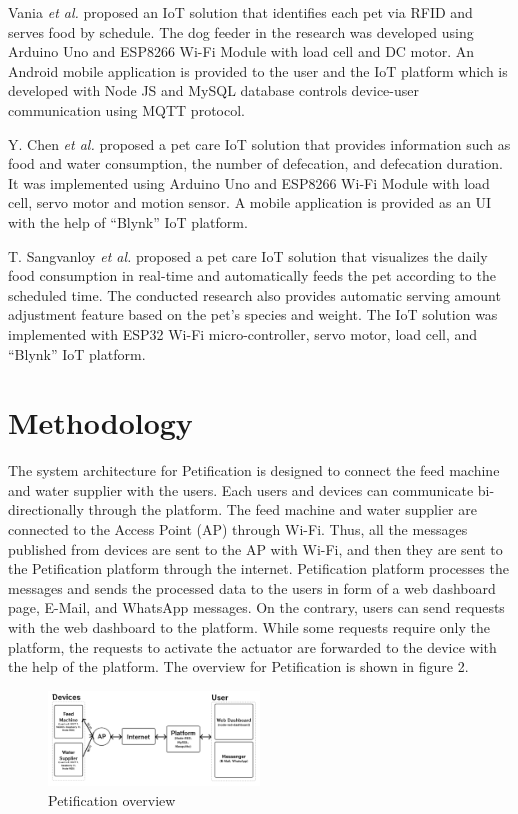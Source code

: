 \documentclass[conference]{IEEEtran}
\begin{document}
Vania \textit{et al.} \cite{b12} proposed an IoT solution that identifies each pet via RFID and serves food by schedule. The dog feeder in the research was developed using Arduino Uno and ESP8266 Wi-Fi Module with load cell and DC motor. An Android mobile application is provided to the user and the IoT platform which is developed with Node JS and MySQL database controls device-user communication using MQTT protocol.

Y. Chen \textit{et al.} \cite{b5} proposed a pet care IoT solution that provides information such as food and water consumption, the number of defecation, and defecation duration. It was implemented using Arduino Uno and ESP8266 Wi-Fi Module with load cell, servo motor and motion sensor. A mobile application is provided as an UI with the help of “Blynk” IoT platform.

T. Sangvanloy \textit{et al.} \cite{b4} proposed a pet care IoT solution that visualizes the daily food consumption in real-time and automatically feeds the pet according to the scheduled time. The conducted research also provides automatic serving amount adjustment feature based on the pet's species and weight. The IoT solution was implemented with ESP32 Wi-Fi micro-controller, servo motor, load cell, and “Blynk” IoT platform.

\section{Methodology}
The system architecture for Petification is designed to connect the feed machine and water supplier with the users. Each users and devices can communicate bi-directionally through the platform. The feed machine and water supplier are connected to the Access Point (AP) through Wi-Fi. Thus, all the messages published from devices are sent to the AP with Wi-Fi, and then they are sent to the Petification platform through the internet. Petification platform processes the messages and sends the processed data to the users in form of a web dashboard page, E-Mail, and WhatsApp messages. On the contrary, users can send requests with the web dashboard to the platform. While some requests require only the platform, the requests to activate the actuator are forwarded to the device with the help of the platform. The overview for Petification is shown in figure 2.

\begin{figure}[htbp]
\centerline{\includegraphics[width=0.5\textwidth]{./images/Overview.png}}
\caption{Petification overview}
\label{fig}
\end{figure}
\end{document}
